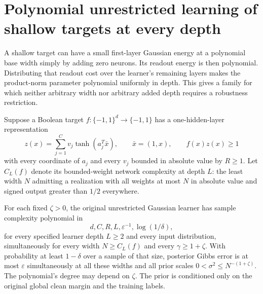 \section{Polynomial unrestricted learning of shallow targets at every depth}
\label{sec:shallow-unrestricted}

A shallow target can have a small first-layer Gaussian energy at a
polynomial base width simply by adding zero neurons. Its readout energy
is then polynomial. Distributing that readout cost over the learner's
remaining layers makes the product-norm parameter polynomial uniformly
in depth. This gives a family for which neither arbitrary width nor
arbitrary added depth requires a robustness restriction.

\begin{theorem}
\label{thm:shallow-all-depths}
Suppose a Boolean target $f:\{-1,1\}^d\to\{-1,1\}$ has a one-hidden-layer
representation
\[
 z(x)=\sum_{j=1}^{C}v_j\tanh(a_j^T\bar x),\qquad
 \bar x=(1,x),\qquad f(x)z(x)\ge1
\]
with every coordinate of $a_j$ and every $v_j$ bounded in absolute value
by $R\ge1$. Let $C_L(f)$ denote its bounded-weight network complexity
at depth $L$: the least width $N$ admitting a realization with all
weights at most $N$ in absolute value and signed output greater than
$1/2$ everywhere.

For each fixed $\zeta>0$, the original unrestricted Gaussian learner has
sample complexity polynomial in
\[
 d,C,R,L,\varepsilon^{-1},\log(1/\delta),
\]
for every specified learner depth $L\ge2$ and every input distribution,
simultaneously for every width $N\ge C_L(f)$ and every
$\gamma\ge1+\zeta$. With probability at least
$1-\delta$ over a sample of that size, posterior Gibbs error is at most
$\varepsilon$ simultaneously at all these widths and all prior scales
$0<\sigma^2\le N^{-(1+\zeta)}$. The polynomial's degree may depend on
$\zeta$. The prior is conditioned only on the original global clean
margin and the training labels.
\end{theorem}

